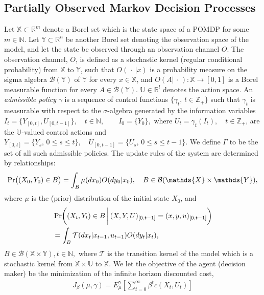 \documentclass[11pt]{article}
\def\Pr{\mathop{\rm Pr}}
\newcommand{\Zplus}{\mathbb{Z}_+}
\begin{document}
\subsection{Partially Observed Markov Decision Processes}
Let $\mathds{X} \subset \mathds{R}^m$ denote a Borel set which is the state space of a POMDP for some $m\in\mathds{N}$. Let
$\mathds{Y} \subset \mathds{R}^n$ be another Borel set denoting the observation space of the model, and let the state be observed through an
observation channel $O$. The observation channel, $O$, is defined as a stochastic kernel (regular
conditional probability) from  $\mathds{X}$ to $\mathds{Y}$, such that
$O(\,\cdot\,|x)$ is a probability measure on the sigma algebra $\mathcal{B}(\mathds{Y})$ of $\mathds{Y}$ for every $x
\in \mathds{X}$, and $O(A|\,\cdot\,): \mathds{X}\to [0,1]$ is a Borel
measurable function for every $A \in \mathcal{B}(\mathds{Y})$.
$\mathds{U}\in \mathds{R}^l$ denotes the action space. An {\em admissible policy} $\gamma$ is a
sequence of control functions $\{\gamma_t,\, t\in \Zplus\}$ such
that $\gamma_t$ is measurable with respect to the $\sigma$-algebra
generated by the information variables
$
I_t=\{Y_{[0,t]},U_{[0,t-1]}\}, \quad t \in \mathds{N}, \quad
  \quad I_0=\{Y_0\},
$
where $U_t=\gamma_t(I_t),\quad t\in \Zplus$,
are the $\mathds{U}$-valued control
actions and 
$Y_{[0,t]} = \{Y_s,\, 0 \leq s \leq t \}, \quad U_{[0,t-1]} =
  \{U_s, \, 0 \leq s \leq t-1 \}.$ We define $\Gamma$ to be the set of all such admissible policies. The update rules of the system are determined by
relationships:
\[  \Pr\bigl( (X_0,Y_0)\in B \bigr) =  \int_B \mu(dx_0)O(dy_0|x_0), \quad B\in \mathcal{B}(\mathds{X}\times\mathds{Y}), \]
where $\mu$ is the (prior) distribution of the initial state $X_0$, and
\begin{eqnarray*}
\label{eq_evol}
 &\Pr\biggl( (X_t,Y_t)\in B \, \bigg|\, (X,Y,U)_{[0,t-1]}=(x,y,u)_{[0,t-1]} \biggr)\\
& = \int_B \mathcal{T}(dx_t|x_{t-1}, u_{t-1})O(dy_t|x_t),  
\end{eqnarray*}
$B\in \mathcal{B}(\mathds{X}\times\mathds{Y}), t\in \mathds{N},$ where $\mathcal{T}$ is the transition kernel of the model which is a stochastic kernel from $\mathds{X}\times
\mathds{U}$ to $\mathds{X}$.  We let the objective of the agent (decision maker) be the minimization of the infinite horizon discounted cost, 
  \begin{align}\label{criterion1}
    J_{\beta}(\mu,\gamma)= E_\mu^{\gamma}\left[\sum_{t=0}^{\infty} \beta^t c(X_t,U_t)\right]
  \end{align}
\end{document}
